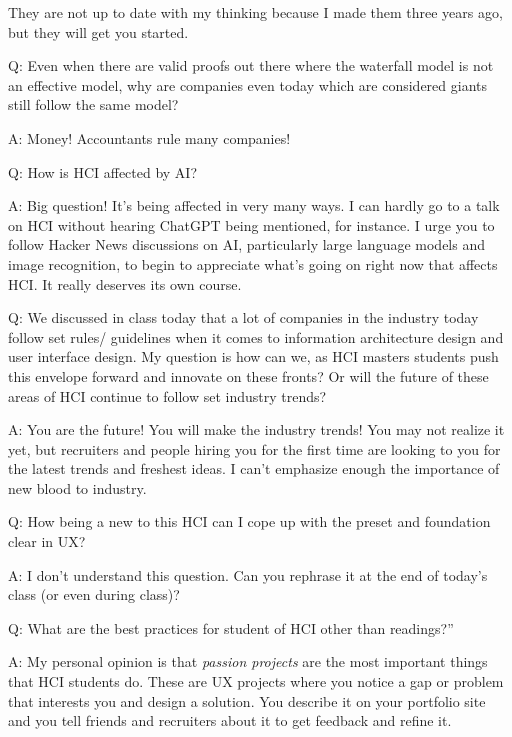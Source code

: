 They are not up to date with my thinking because I made them three years
ago, but they will get you started.

Q: Even when there are valid proofs out there where the waterfall model
is not an effective model, why are companies even today which are
considered giants still follow the same model?

A: Money! Accountants rule many companies!

Q: How is HCI affected by AI?

A: Big question! It's being affected in very many ways. I can hardly go
to a talk on HCI without hearing ChatGPT being mentioned, for instance.
I urge you to follow Hacker News discussions on AI, particularly large
language models and image recognition, to begin to appreciate what's
going on right now that affects HCI. It really deserves its own course.

Q: We discussed in class today that a lot of companies in the industry
today follow set rules/ guidelines when it comes to information
architecture design and user interface design. My question is how can
we, as HCI masters students push this envelope forward and innovate on
these fronts? Or will the future of these areas of HCI continue to
follow set industry trends?

A: You are the future! You will make the industry trends! You may not
realize it yet, but recruiters and people hiring you for the first time
are looking to you for the latest trends and freshest ideas. I can't
emphasize enough the importance of new blood to industry.

Q: How being a new to this HCI can I cope up with the preset and
foundation clear in UX?

A: I don't understand this question. Can you rephrase it at the end of
today's class (or even during class)?

Q: What are the best practices for student of HCI other than readings?''

A: My personal opinion is that \emph{passion projects} are the most
important things that HCI students do. These are UX projects where you
notice a gap or problem that interests you and design a solution. You
describe it on your portfolio site and you tell friends and recruiters
about it to get feedback and refine it.

